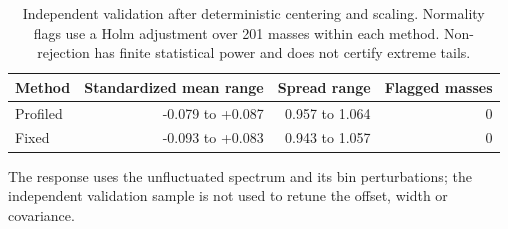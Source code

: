 \begin{table}[H]\centering\small
\begin{tabular}{lrrr}\toprule
Method & Standardized mean range & Spread range & Flagged masses\\\midrule
Profiled & -0.079 to +0.087 & 0.957 to 1.064 & 0 \\
Fixed & -0.093 to +0.083 & 0.943 to 1.057 & 0 \\
\bottomrule\end{tabular}
\caption{Independent validation after deterministic centering and scaling. Normality flags use a Holm adjustment over 201 masses within each method. Non-rejection has finite statistical power and does not certify extreme tails.}\end{table}
The response uses the unfluctuated spectrum and its bin perturbations; the independent validation sample is not used to retune the offset, width or covariance.

